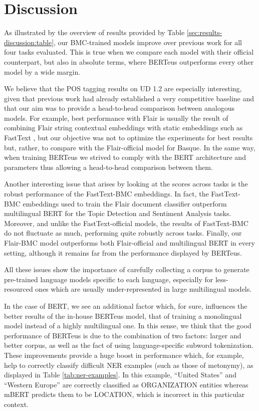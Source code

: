\documentclass[10pt, a4paper]{article}
\begin{document}
\section{Discussion}\label{sec:discussion}

As illustrated by the overview of results provided by Table \ref{sec:results-discussion:table}, our BMC-trained models improve over previous work for all four tasks evaluated. This is true when we compare each model with their official counterpart, but also in absolute terms, where BERTeus outperforms every other model by a wide margin.

We believe that the POS tagging results on UD 1.2 are especially interesting, given that previous work had already established a very competitive baseline \cite{heinzerling-strube-2019-sequence} and that our aim was to provide a head-to-head comparison between analogous models. For example, best performance with Flair is usually the result of combining Flair string contextual embeddings with static embeddings such as FastText \cite{akbik2018coling}, but our objective was not to optimize the experiments for best results but, rather, to compare with the Flair-official model for Basque. In the same way, when training BERTeus we strived to comply with the BERT architecture and parameters thus allowing a
head-to-head comparison between them.

Another interesting issue that arises by looking at the scores across tasks is the robust performance of the FastText-BMC embeddings. In fact, the FastText-BMC embeddings used to train the Flair document classifier outperform multilingual BERT for the Topic Detection and Sentiment Analysis tasks. Moreover, and unlike the FastText-official models, the results of FastText-BMC do not fluctuate as much, performing quite robustly across tasks. Finally, our Flair-BMC model outperforms both Flair-official and multilingual BERT in every setting, although it remains far from the performance displayed by BERTeus.

All these issues show the importance of carefully collecting a corpus to generate pre-trained language models specific to each language, especially for less-resourced ones which are usually under-represented in large multilingual models.

In the case of BERT, we see an additional factor which, for sure, influences the better results of the in-house BERTeus model, that of training a monolingual model instead of a highly multilingual one. In this sense, we think that the good performance of BERTeus is due to the combination of two factors: larger and better corpus, as well as the fact of using language-specific subword tokenization. These improvements provide a huge boost in performance which, for example, help to correctly classify difficult NER examples (such as those of metonymy), as displayed in Table \ref{tab:ner-examples}. In this example, ``United States'' and ``Western Europe'' are correctly classified as ORGANIZATION entities whereas mBERT predicts them to be LOCATION, which is incorrect in this particular context.
\end{document}
